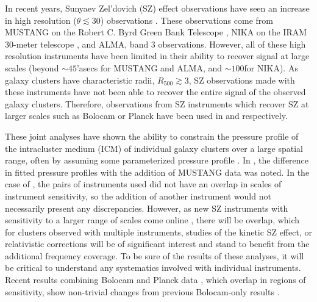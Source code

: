 \documentclass[iop,numberedappendix,apj]{emulateapj}
\begin{document}
In recent years, Sunyaev Zel'dovich (SZ) effect observations have seen an increase in high resolution ($\theta \lesssim 30$\asecs)
observations \citep[e.g.][]{mason2010,adam2014,kitayama2016}. These observations come from MUSTANG on the
Robert C. Byrd Green Bank Telescope \citep[GBT][]{dicker2008}, NIKA on the IRAM 30-meter telescope \citep{monfardini2010},
and ALMA, band 3 observations. However, all of these high resolution instruments have been limited in their ability to
recover signal at large scales (beyond $\sim 45$'asecs for MUSTANG and ALMA, and $\sim 100$\asecs for NIKA). As galaxy clusters
have characteristic radii, $R_{500} \gtrsim 3$\amin, SZ observations made with these instruments have not been able to recover the
entire signal of the observed galaxy clusters. Therefore, observations from SZ instruments which recover SZ at larger scales
such as Bolocam \citet{czakon2015} or Planck \citep{planck2013a} have been used in \citet{romero2015a} and \citet{adam2014} respectively.

These joint analyses have shown the ability to constrain the pressure profile of the intracluster medium (ICM) of individual
galaxy clusters over a large spatial range, often by assuming some parameterized pressure profile \citep[e.g.][]{romero2016,adam2014}.
In \citet{romero2015a}, the difference in fitted pressure profiles with the addition of MUSTANG data was noted. In the case of
\citet{romero2016,adam2014}, the pairs of instruments used did not have an overlap in scales of instrument sensitivity, so the
addition of another instrument would not necessarily present any discrepancies. However, as new SZ instruments with sensitivity to
a larger range of scales come online \citep{monfardini2014,dicker2014a}, there will be overlap, which for clusters observed with
multiple instruments, studies of the kinetic SZ effect, or relativistic corrections \citep{itoh1998} will be of significant interest and
stand to benefit from the additional frequency coverage. To be sure of the results of these analyses, it will be critical to
understand any systematics involved with individual instruments. Recent results combining Bolocam and Planck data \citep{sayers2016},
which overlap in regions of sensitivity, show non-trivial changes from previous Bolocam-only results \citep{sayers2013}.
\end{document}

